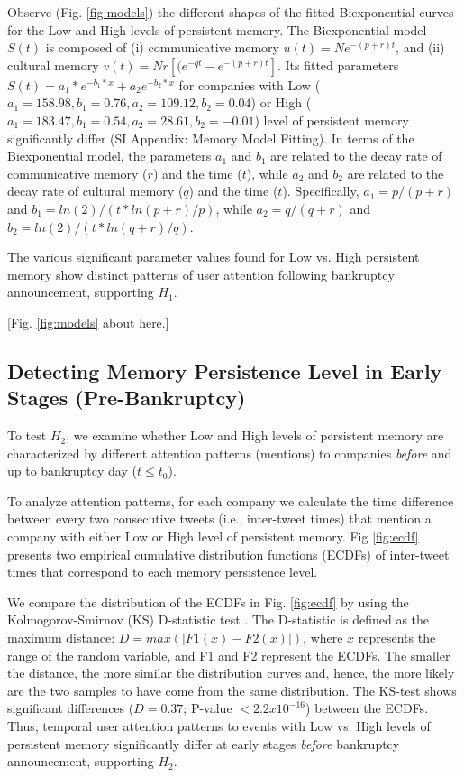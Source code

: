 \documentclass[9pt,twocolumn,twoside,lineno]{pnas-new}
\begin{document}
Observe (Fig. \ref{fig:models}) the different shapes of the fitted Biexponential curves for the Low and High levels of persistent memory.
The Biexponential model $S(t)$ is composed of 
(i) communicative memory $u(t) = Ne^{-(p+r)t}$, and
(ii) cultural memory $v(t) = Nr[(e^{-qt}-e^{-(p+r)t}]$.
Its fitted parameters $S(t)=a_1*e^{-b_1*x}+a_2e^{-b_2*x}$ for companies with Low ($a_1=158.98, b_1=0.76, a_2=109.12, b_2=0.04$) or High ($a_1 = 183.47, b_1 = 0.54, a_2 = 28.61, b_2 = -0.01$) level of persistent memory significantly differ (SI Appendix: Memory Model Fitting).
In terms of the Biexponential model, the parameters $a_1$ and $b_1$ are related to the decay rate of communicative memory ($r$) and the time ($t$), while $a_2$ and $b_2$ are related to the decay rate of cultural memory ($q$) and the time ($t$).
Specifically, $a_1 = p/(p+r)$ and $b_1 = ln(2)/(t*ln(p+r)/p)$, while $a_2 = q/(q+r)$ and $b_2 = ln(2)/(t*ln(q+r)/q)$.

The various significant parameter values found for Low vs. High persistent memory show distinct patterns of user attention following bankruptcy announcement, supporting $H_1$.

\centerline{[Fig. \ref{fig:models} about here.]}


\subsection*{Detecting Memory Persistence Level in Early Stages (Pre-Bankruptcy)}
To test $H_2$, we examine whether Low and High levels of persistent memory are characterized by different attention patterns (mentions) to companies \textit{before} and up to bankruptcy day ($t \leq t_0$). 

To analyze attention patterns, for each company we calculate the time difference between every two consecutive tweets (i.e., inter-tweet times) that mention a company with either Low or High level of persistent memory.
Fig \ref{fig:ecdf} presents two empirical cumulative distribution functions (ECDFs) of inter-tweet times that correspond to each memory persistence level.

We compare the distribution of the ECDFs in Fig. \ref{fig:ecdf} by using the Kolmogorov-Smirnov (KS) D-statistic test \cite{feller1948kolmogorov}. 
The D-statistic is defined as the maximum distance: $D = max(|F1(x) - F2(x)|)$, where $x$ represents the range of the random variable, and F1 and F2 represent the ECDFs. 
The smaller the distance, the more similar the distribution curves and, hence, the more likely are the two samples to have come from the same distribution. 
The KS-test shows significant differences ($D = 0.37$; P-value $< 2.2 x 10^{-16}$) between the ECDFs.
Thus, temporal user attention patterns to events with Low vs. High levels of persistent memory significantly differ at early stages \textit{before} bankruptcy announcement, supporting $H_2$.
\end{document}
